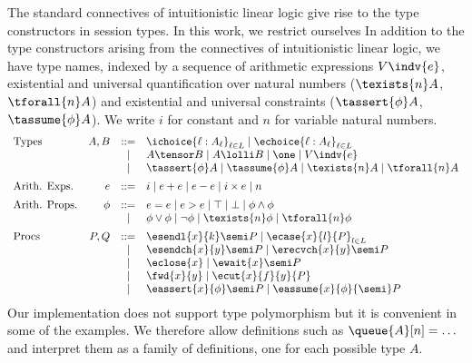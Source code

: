 The standard connectives of intuitionistic linear logic give rise
to the type constructors in session types.
In this work, we restrict ourselves 
In addition to the type constructors arising
from the connectives of intuitionistic linear logic, we have type names,
indexed by a
sequence of arithmetic expressions $V \indv{e}$, existential and
universal quantification over natural numbers ($\texists{n} A$,
$\tforall{n} A$) and existential and universal constraints
($\tassert{\phi} A$, $\tassume{\phi} A$).  We write $i$ for constant
and $n$ for variable natural numbers.
\[
  \begin{array}{lrcl}
    \mbox{Types} & A, B & ::= & \ichoice{\ell : A_\ell}_{\ell \in L}
    \mid \echoice{\ell : A_\ell}_{\ell \in L} \\
                 & & \mid & A \tensor B \mid A \lolli B \mid \one \mid V \indv{e} \\
                 & & \mid & \tassert{\phi} A \mid \tassume{\phi} A
                            \mid \texists{n} A \mid \tforall{n} A \\[0.5em]
    \mbox{Arith. Exps.} & e & ::= & i \mid e + e \mid e - e \mid i \times e \mid n \\[0.5em]
    \mbox{Arith. Props.} &
    \phi & ::= & e = e \mid e > e \mid \top \mid \bot
                 \mid \phi \land \phi \\
    & & \mid &  \phi \lor \phi \mid \lnot \phi \mid \texists{n}\phi \mid \tforall{n} \phi \\[0.5em]
    \mbox{Procs} & P, Q & ::= & \esendl{x}{k} \semi P \mid \ecase{x}{l}{P}_{l \in L} \\
                & & \mid & \esendch{x}{y} \semi P \mid \erecvch{x}{y} \semi P \\
                & & \mid & \eclose{x} \mid \ewait{x} \semi P \\
                & & \mid & \fwd{x}{y} \mid \ecut{x}{f}{y}{P} \\
                & & \mid & \eassert{x}{\phi} \semi P \mid \eassume{x}{\phi} {\semi} P
  \end{array}
\]
Our implementation does not support type polymorphism but it is convenient in
some of the examples.  We therefore allow definitions such as
$\queue{A}[n] = \ldots$ and interpret them as a family of definitions,
one for each possible type $A$.

